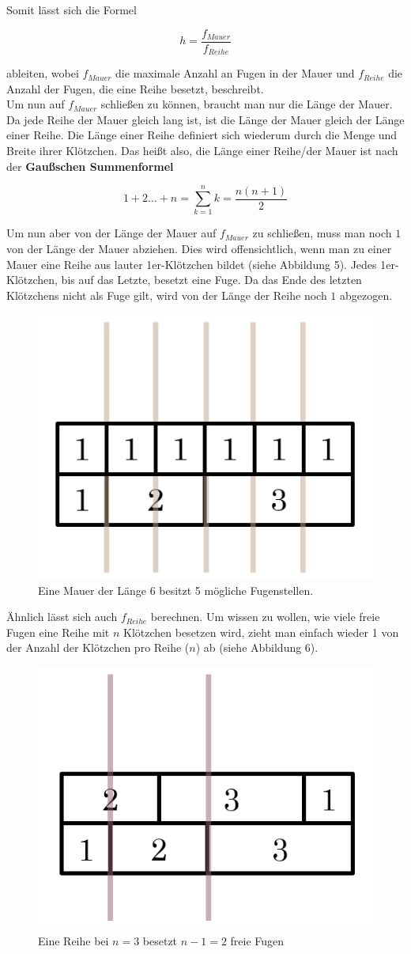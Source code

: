 \documentclass[a4paper,12pt]{article}
\begin{document}
Somit lässt sich die Formel
\begin{center}
\begin{Large}
\[h = \frac{f_{Mauer}}{f_{Reihe}}\]
\end{Large}
\end{center}
ableiten, wobei $f_{Mauer}$ die maximale Anzahl an Fugen in der Mauer und $f_{Reihe}$ die Anzahl der Fugen, die eine Reihe besetzt, beschreibt.
\\[0.4cm]
Um nun auf $f_{Mauer}$ schließen zu können, braucht man nur die Länge der Mauer. Da jede Reihe der Mauer gleich lang ist, ist die Länge der Mauer gleich der Länge einer Reihe. Die Länge einer Reihe definiert sich wiederum durch die Menge und Breite ihrer Klötzchen. Das heißt also, die Länge einer Reihe/der Mauer ist nach der \textbf{Gaußschen Summenformel} \cite{gaussche_summenformel}
\begin{center}
\begin{Large}
\[1+2...+n = \sum_{k=1}^n k = \frac{n(n+1)}{2}\]
\end{Large}
\end{center}
Um nun aber von der Länge der Mauer auf $f_{Mauer}$ zu schließen, muss man noch $1$ von der Länge der Mauer abziehen. Dies wird offensichtlich, wenn man zu einer Mauer eine Reihe aus lauter 1er-Klötzchen bildet (siehe Abbildung 5). Jedes 1er-Klötzchen, bis auf das Letzte, besetzt eine Fuge. Da das Ende des letzten Klötzchens nicht als Fuge gilt, wird von der Länge der Reihe noch $1$ abgezogen.
\begin{figure}[H]
    \centering
    \includegraphics[width=0.4\linewidth]{Bilder/Aufgabe1/Definition_Fugenstellen_Mauer.png}
    \caption{Eine Mauer der Länge 6 besitzt 5 mögliche Fugenstellen.}
\end{figure}

Ähnlich lässt sich auch $f_{Reihe}$ berechnen. Um wissen zu wollen, wie viele freie Fugen eine Reihe mit $n$ Klötzchen besetzen wird, zieht man einfach wieder 1 von der Anzahl der Klötzchen pro Reihe ($n$) ab (siehe Abbildung 6).
\begin{figure}[H]
    \centering
    \includegraphics[width=0.4\linewidth]{Bilder/Aufgabe1/Definition_Fugenstellen_Reihe.png}
    \caption{Eine Reihe bei $n = 3$ besetzt $n-1 = 2$ freie Fugen}
\end{figure}
\end{document}
